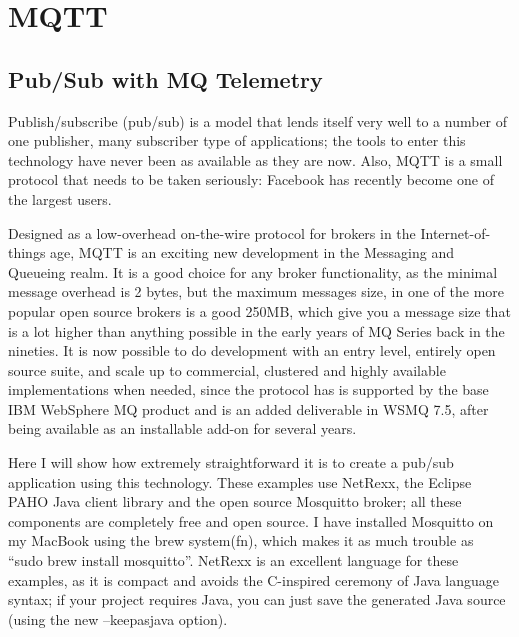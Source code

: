 \chapter{MQTT}\label{mqtt}
 
 
\section{Pub/Sub with MQ Telemetry }
 
Publish/subscribe (pub/sub) is a model that lends itself very well to a number of one publisher, many subscriber type of applications; the tools to enter this technology have never been as available as they are now. Also, MQTT is a small protocol that needs to be taken seriously: Facebook has recently become one of the largest users.
 
Designed as a low-overhead on-the-wire protocol for brokers in the Internet-of-things age, MQTT is an exciting new development in the Messaging and Queueing realm. It is a good choice for any broker functionality, as the minimal message overhead is 2 bytes, but the maximum messages size, in one of the more popular open source brokers is a good 250MB, which give you a message size that is a lot higher than anything possible in the early years of MQ Series back in the nineties. It is now possible to do development with an entry level, entirely open source suite, and scale up to commercial, clustered and highly available implementations when needed, since the protocol has is supported by the base IBM WebSphere MQ product and is an added deliverable in WSMQ 7.5, after being available as an installable add-on for several years.
 
Here I will show how extremely straightforward it is to create a pub/sub application using this technology. These examples use NetRexx, the Eclipse PAHO Java client library and the open source Mosquitto broker; all these components are completely free and open source. I have installed Mosquitto on my MacBook using the brew system(fn), which makes it as much trouble as “sudo brew install mosquitto”.  NetRexx is an excellent language for these examples, as it is compact and avoids the C-inspired ceremony of Java language syntax; if your project requires Java, you can just save the generated Java source (using the new –keepasjava option).
 
